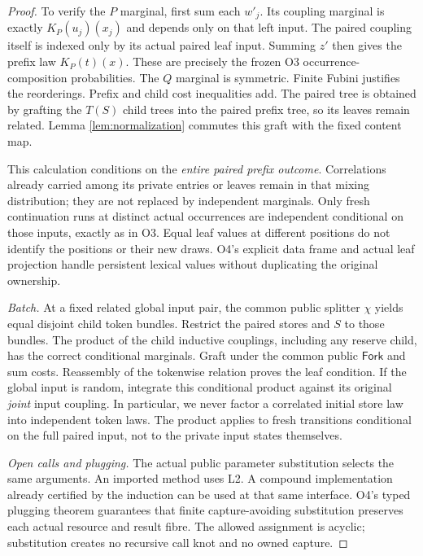 \documentclass[11pt,a4paper]{article}
\theoremstyle{definition}
\begin{document}
\begin{proof}
To verify the $P$ marginal, first sum each $w'_j$. Its coupling marginal
is exactly $K_P(u_j)(x_j)$ and depends only on that left input. The paired coupling itself
is indexed only by its actual paired leaf input. Summing $z'$
then gives the prefix law $K_P(t)(x)$. These are precisely the frozen
O3 occurrence-composition probabilities. The $Q$ marginal is symmetric.
Finite Fubini justifies the reorderings. Prefix and child cost inequalities
add. The paired tree is obtained by grafting the $T(S)$ child trees into
the paired prefix tree, so its leaves remain related. Lemma
\ref{lem:normalization} commutes this graft with the fixed content map.

This calculation conditions on the \emph{entire paired prefix outcome}.
Correlations already carried among its private entries or leaves remain
in that mixing distribution; they are not replaced by independent
marginals. Only fresh continuation runs at distinct actual occurrences
are independent conditional on those inputs, exactly as in O3. Equal
leaf values at different positions do not identify the positions or their
new draws. O4's explicit data frame and actual leaf projection handle
persistent lexical values without duplicating the original ownership.

\emph{Batch.} At a fixed related global input pair, the common public
splitter $\chi$ yields equal disjoint child token bundles. Restrict the
paired stores and $S$ to those bundles. The product of the child
inductive couplings, including any reserve child, has the correct
conditional marginals. Graft under the common public $\mathsf{Fork}$
and sum costs. Reassembly of the tokenwise relation proves the leaf
condition. If the global input is random, integrate this conditional
product against its original \emph{joint} input coupling. In particular,
we never factor a correlated initial store law into independent token
laws. The product applies to fresh transitions conditional on the full
paired input, not to the private input states themselves.

\emph{Open calls and plugging.} The actual public parameter substitution
selects the same arguments. An imported method uses L2. A compound
implementation already certified by the induction can be used at that
same interface. O4's typed plugging theorem guarantees that finite
capture-avoiding substitution preserves each actual resource and result
fibre. The allowed assignment is acyclic; substitution creates no
recursive call knot and no owned capture.


\end{proof}
\end{document}
